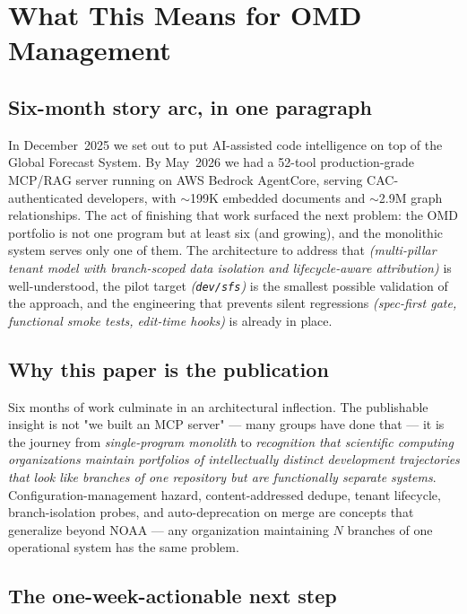 \documentclass[11pt,letterpaper]{article}
\begin{document}
\section{What This Means for OMD Management}

\subsection{Six-month story arc, in one paragraph}

In December~2025 we set out to put AI-assisted code intelligence on
top of the Global Forecast System. By May~2026 we had a 52-tool
production-grade MCP/RAG server running on AWS Bedrock AgentCore,
serving CAC-authenticated developers, with $\sim$199K embedded
documents and $\sim$2.9M graph relationships. The act of finishing
that work surfaced the next problem: the OMD portfolio is not one
program but at least six (and growing), and the monolithic system
serves only one of them. The architecture to address that
\emph{(multi-pillar tenant model with branch-scoped data isolation
and lifecycle-aware attribution)} is well-understood, the pilot
target \emph{(\texttt{dev/sfs})} is the smallest possible validation
of the approach, and the engineering that prevents silent regressions
\emph{(spec-first gate, functional smoke tests, edit-time hooks)} is
already in place.

\subsection{Why this paper is the publication}

Six months of work culminate in an architectural inflection. The
publishable insight is not "we built an MCP server" --- many groups
have done that --- it is the journey from \emph{single-program
monolith} to \emph{recognition that scientific computing organizations
maintain portfolios of intellectually distinct development trajectories
that look like branches of one repository but are functionally
separate systems}. Configuration-management hazard, content-addressed
dedupe, tenant lifecycle, branch-isolation probes, and auto-deprecation
on merge are concepts that generalize beyond NOAA --- any organization
maintaining $N$ branches of one operational system has the same
problem.

\subsection{The one-week-actionable next step}
\end{document}
